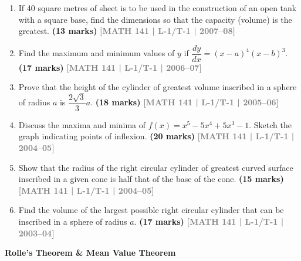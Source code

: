 \documentclass[12pt,a4paper]{article}
\newcommand{\yr}[1]{\hfill\textcolor{gray}{\small\textbf{[#1]}}}
\newcommand{\mk}[1]{\textcolor{orange!70!black}{\small\textbf{(#1 marks)}}}
\newcommand{\subtopic}[2]{%
  \vspace{10pt}
  \noindent\begin{tcolorbox}[colback=#1!8,colframe=#1,boxrule=0.6pt,arc=4pt,
    left=6pt,right=6pt,top=4pt,bottom=4pt]
    \small\bfseries\textcolor{#1}{#2}
  \end{tcolorbox}
  \vspace{2pt}
}
\begin{document}
\begin{enumerate}
\item If 40 square metres of sheet is to be used in the construction of an open tank with a square base, find the dimensions so that the capacity (volume) is the greatest.
\mk{13} \yr{MATH 141 | L-1/T-1 | 2007--08}

\item Find the maximum and minimum values of $y$ if $\dfrac{dy}{dx}=(x-a)^{4}(x-b)^{3}$.
\mk{17} \yr{MATH 141 | L-1/T-1 | 2006--07}

\item Prove that the height of the cylinder of greatest volume inscribed in a sphere of radius $a$ is $\dfrac{2\sqrt{3}}{3}a$.
\mk{18} \yr{MATH 141 | L-1/T-1 | 2005--06}

\item Discuss the maxima and minima of $f(x)=x^{5}-5x^{4}+5x^{3}-1$. Sketch the graph indicating points of inflexion.
\mk{20} \yr{MATH 141 | L-1/T-1 | 2004--05}

\item Show that the radius of the right circular cylinder of greatest curved surface inscribed in a given cone is half that of the base of the cone.
\mk{15} \yr{MATH 141 | L-1/T-1 | 2004--05}

\item Find the volume of the largest possible right circular cylinder that can be inscribed in a sphere of radius $a$.
\mk{17} \yr{MATH 141 | L-1/T-1 | 2003--04}

\end{enumerate}

\subtopic{cA}{Rolle's Theorem \& Mean Value Theorem}
\label{sub:s1-rolle}
\end{document}
